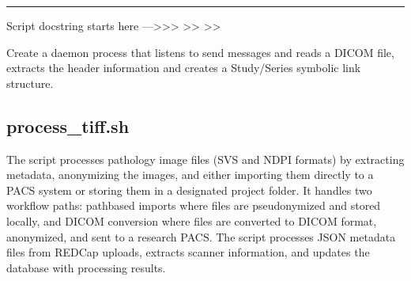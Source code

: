 \documentclass[letterpaper,10pt,english]{sphinxmanual}
\begin{document}
\bigskip\hrule\bigskip


\sphinxAtStartPar
Script docstring starts here —\textgreater{}\textgreater{}\textgreater{}
\textendash{}\textgreater{}\textgreater{}
\textendash{}\textgreater{}\textgreater{}

\sphinxAtStartPar
Create a daemon process that listens to send messages and reads a DICOM file,
extracts the header information and creates a Study/Series symbolic link structure.
\begin{description}
\sphinxAtStartPar
{}

\end{description}

\sphinxstepscope


\subsection{process\_tiff.sh}
\label{\detokenize{Architecture/scripts/process_tiff:process-tiff-sh}}\label{\detokenize{Architecture/scripts/process_tiff::doc}}
\sphinxAtStartPar
The  script processes pathology image files (SVS and NDPI formats) by extracting metadata, anonymizing the images, and either importing them directly to a PACS system or storing them in a designated project folder. It handles two workflow paths: path\sphinxhyphen{}based imports where files are pseudonymized and stored locally, and DICOM conversion where files are converted to DICOM format, anonymized, and sent to a research PACS. The script processes JSON metadata files from REDCap uploads, extracts scanner information, and updates the database with processing results.

\sphinxAtStartPar
{}


\sphinxAtStartPar
{}

\end{document}
